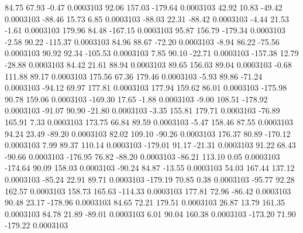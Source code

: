        84.75       67.93       -0.47     0.0003103
       92.06      157.03     -179.64     0.0003103
       42.92       10.83      -49.42     0.0003103
      -88.46       15.73        6.85     0.0003103
      -88.03       22.31      -88.42     0.0003103
       -4.44       21.53       -1.61     0.0003103
      179.96       84.48     -167.15     0.0003103
       95.87      156.79     -179.34     0.0003103
       -2.58       90.22     -115.37     0.0003103
       84.96       88.67      -72.20     0.0003103
       -8.94       86.22      -75.56     0.0003103
       90.92       92.34     -105.53     0.0003103
        7.85       90.10      -22.71     0.0003103
     -157.38       12.79      -28.88     0.0003103
       84.42       21.61       88.94     0.0003103
       89.65      156.03       89.04     0.0003103
       -0.68      111.88       89.17     0.0003103
      175.56       67.36      179.46     0.0003103
       -5.93       89.86      -71.24     0.0003103
      -94.12       69.97      177.81     0.0003103
      177.94      159.62       86.01     0.0003103
     -175.98       90.78      159.06     0.0003103
     -169.30       17.65       -1.88     0.0003103
       -9.00      108.51     -178.92     0.0003103
      -91.07       90.90      -21.80     0.0003103
       -3.35      155.81      179.71     0.0003103
      -76.89      165.91        7.33     0.0003103
      173.75       66.84       89.59     0.0003103
       -5.47      158.46       87.55     0.0003103
       94.24       23.49      -89.20     0.0003103
       82.02      109.10      -90.26     0.0003103
      176.37       80.89     -170.12     0.0003103
        7.99       89.37      110.14     0.0003103
     -179.01       91.17      -21.31     0.0003103
       91.22       68.43      -90.66     0.0003103
     -176.95       76.82      -88.20     0.0003103
      -86.21      113.10        0.05     0.0003103
     -174.64       90.09      158.03     0.0003103
      -90.24       84.87      -13.55     0.0003103
       54.03      167.44      137.12     0.0003103
      -85.24       22.91       89.71     0.0003103
     -179.19       70.85        0.38     0.0003103
      -95.77       92.28      162.57     0.0003103
      158.73      165.63     -114.33     0.0003103
      177.81       72.96      -86.42     0.0003103
       90.48       23.17     -178.96     0.0003103
       84.65       72.21      179.51     0.0003103
       26.87       13.79      161.35     0.0003103
       84.78       21.89      -89.01     0.0003103
        6.01       90.04      160.38     0.0003103
     -173.20       71.90     -179.22     0.0003103
